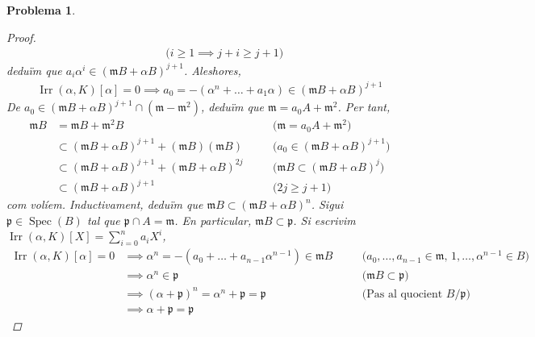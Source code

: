\documentclass{article}
\DeclareMathOperator{\Irr}{Irr}
\DeclareMathOperator{\Spec}{Spec}
\newtheorem{problema}{Problema}
\begin{document}
\begin{problema}
\begin{enumerate}
\begin{proof}
\begin{align*}
                &\quad&\textrm{($i\geq1\implies j+i\geq j+1$)}
            \end{align*}
            deduïm que $a_{i}\alpha^{i}\in(\mathfrak{m}B+\alpha B)^{j+1}$. Aleshores,
            \begin{align*}
                \Irr(\alpha,K)[\alpha]=0
                \implies a_{0}=-(\alpha^{n}+\ldots+a_{1}\alpha)
                \in(\mathfrak{m}B+\alpha B)^{j+1}
            \end{align*}
            De $a_{0}\in(\mathfrak{m}B+\alpha B)^{j+1}\cap(\mathfrak{m}-\mathfrak{m}^{2})$, deduïm que $\mathfrak{m}=a_{0}A+\mathfrak{m}^{2}$. Per tant,
            \begin{align*}
                \mathfrak{m}B
                &=\mathfrak{m}B+\mathfrak{m}^{2}B
                &\quad&\textrm{($\mathfrak{m}=a_{0}A+\mathfrak{m}^{2}$)}\\
                &\subset(\mathfrak{m}B+\alpha B)^{j+1}+(\mathfrak{m}B)(\mathfrak{m}B)
                &\quad&\textrm{($a_{0}\in(\mathfrak{m}B+\alpha B)^{j+1}$)}\\
                &\subset(\mathfrak{m}B+\alpha B)^{j+1}+(\mathfrak{m}B+\alpha B)^{2j}
                &\quad&\textrm{($\mathfrak{m}B\subset(\mathfrak{m}B+\alpha B)^{j}$)}\\
                &\subset(\mathfrak{m}B+\alpha B)^{j+1}
                &\quad&\textrm{($2j\geq j+1$)}
            \end{align*}
            com volíem. Inductivament, deduïm que $\mathfrak{m}B\subset(\mathfrak{m}B+\alpha B)^{n}$.
            \newline
            Sigui $\mathfrak{p}\in\Spec(B)$ tal que $\mathfrak{p}\cap A=\mathfrak{m}$. En particular, $\mathfrak{m}B\subset\mathfrak{p}$. Si escrivim $\Irr(\alpha,K)[X]=\sum_{i=0}^{n}a_{i}X^{i}$,
            \begin{align*}
                \Irr(\alpha,K)[\alpha]=0
                &\implies\alpha^{n}=-(a_{0}+\ldots+a_{n-1}\alpha^{n-1})\in\mathfrak{m}B
                &\quad&\textrm{($a_{0},\ldots,a_{n-1}\in\mathfrak{m}$, $1,\ldots,\alpha^{n-1}\in B$)}\\
                &\implies\alpha^{n}\in\mathfrak{p}
                &\quad&\textrm{($\mathfrak{m}B\subset\mathfrak{p}$)}\\
                &\implies(\alpha+\mathfrak{p})^{n}=\alpha^{n}+\mathfrak{p}=\mathfrak{p}
                &\quad&\textrm{(Pas al quocient $B/\mathfrak{p}$)}\\
                &\implies\alpha+\mathfrak{p}=\mathfrak{p}

\end{align*}
\end{proof}
\end{enumerate}
\end{problema}
\end{document}
